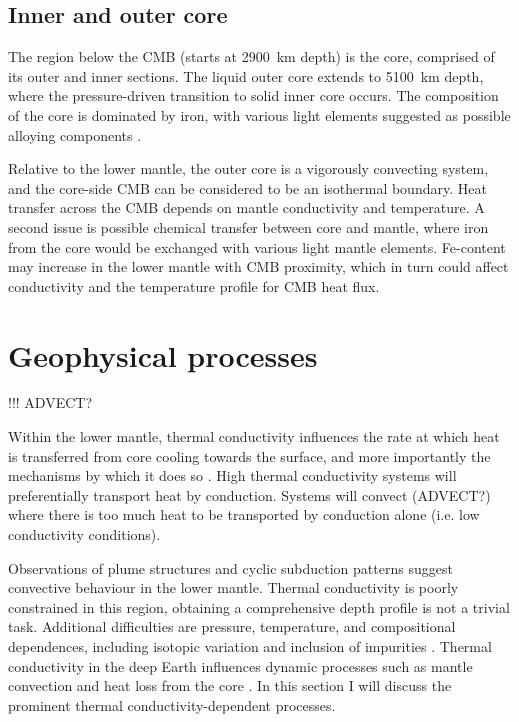 \subsection{Inner and outer core}

The region below the CMB (starts at 2900~km depth) is the core, comprised of its outer and inner sections. The liquid outer core extends to 5100~km depth, where the pressure-driven transition to solid inner core occurs. The composition of the core is dominated by iron, with various light elements suggested as possible alloying components \citep[e.g.][]{Allegre1995, Alfe2007}.

Relative to the lower mantle, the outer core is a vigorously convecting system, and the core-side CMB can be considered to be an isothermal boundary. Heat transfer across the CMB depends on mantle conductivity and temperature. A second issue is possible chemical transfer between core and mantle, where iron from the core would be exchanged with various light mantle elements. Fe-content may increase in the lower mantle with CMB proximity, which in turn could affect conductivity and the temperature profile for CMB heat flux.








\section{Geophysical processes}
\label{sec:ch1:cond_in_earth}

!!! ADVECT?

Within the lower mantle, thermal conductivity influences the rate at which heat is transferred from core cooling towards the surface, and more importantly the mechanisms by which it does so \citep{Lay2008}. High thermal conductivity systems will preferentially transport heat by conduction. Systems will convect (ADVECT?) where there is too much heat to be transported by conduction alone (i.e. low conductivity conditions).

Observations of plume structures and cyclic subduction patterns \citep[see][]{Garnero2008} suggest convective behaviour in the lower mantle. Thermal conductivity is poorly constrained in this region, obtaining a comprehensive depth profile is not a trivial task. Additional difficulties are pressure, temperature, and compositional dependences, including isotopic variation \citep{Tang2010,Dalton2013,Tang2014} and inclusion of impurities \citep{Manthilake2011,Ammann2014,Ohta2014}. Thermal conductivity in the deep Earth influences dynamic processes such as mantle convection and heat loss from the core \citep{Lay2008}. In this section I will discuss the prominent thermal conductivity-dependent processes.


